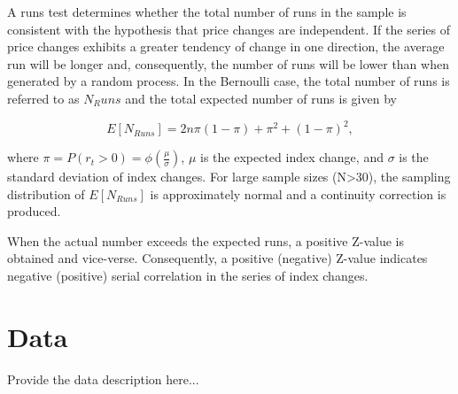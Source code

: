 \documentclass[AEJ,reqno, draftmode]{AEA}
\begin{document}
A runs test determines whether the total number of runs in the sample is consistent with the hypothesis that price changes are independent. If the series of price changes exhibits a greater tendency of change in one direction, the average run will be longer and, consequently, the number of runs will be lower than when generated by a random process. In the Bernoulli case, the total number of runs is referred to as $N_Runs$ and the total expected number of runs is given by

\begin{equation}
    E[N_{Runs}] = 2n\pi (1-\pi) + \pi^2 + (1- \pi)^2,
\end{equation}

where $\pi = P(r_t>0) = \phi \left(\frac{\mu}{\sigma}\right)$, $\mu$ is the expected index change, and $\sigma$ is the standard deviation of index changes. For large sample sizes (N>30), the sampling distribution of $E[N_{Runs}]$ is approximately normal and a continuity correction is produced.

When the actual number exceeds the expected runs, a positive Z-value is obtained and vice-verse. Consequently, a positive (negative) Z-value indicates negative (positive) serial correlation in the series of index changes.




\section{Data}


Provide the data description here...




\restoregeometry



\restoregeometry








%
\restoregeometry



\restoregeometry




\restoregeometry


\restoregeometry
\end{document}
